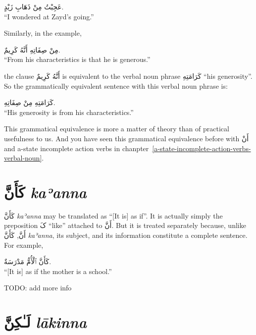 \documentclass[
  10pt,
]{book}
\begin{document}
\foreignlanguage{arabic}{عَجِبْتُ مِنْ ذَهَابِ زَيْدٍ.}\\
\enquote{I wondered at Zayd's going.}

Similarly, in the example,

\foreignlanguage{arabic}{مِنْ صِفَاتِهِ أَنَّهُ کَرِيمٌ.}\\
\enquote{From his characteristics is that he is generous.}

the clause
\foreignlanguage{arabic}{أَنَّهُ کَرِيمٌ}
is equivalent to the verbal noun phrase \foreignlanguage{arabic}{کَرَامَتِهِ} \enquote{his generosity}. So the grammatically equivalent sentence with this verbal noun phrase is:

\foreignlanguage{arabic}{کَرَامَتِهِ مِنْ صِفَاتِهِ.}\\
\enquote{His generosity is from his characteristics.}

This grammatical equivalence is more a matter of theory than of practical usefulness to us.
And you have seen this grammatical equivalence before with \foreignlanguage{arabic}{أَنْ} and a-state incomplete action verbs in chanpter~\ref{a-state-incomplete-action-verbs-verbal-noun}.

\section{\texorpdfstring{\foreignlanguage{arabic}{کَأَنَّ} \emph{kaʾanna}}{کَأَنَّ kaʾanna}}\label{ux643ux623ux646-kaeanna}

\foreignlanguage{arabic}{کَأَنَّ} \emph{kaʾanna}
may be translated as \enquote{{[}It is{]} as if}.
It is actually simply the preposition \foreignlanguage{arabic}{کَ} \enquote{like} attached to \foreignlanguage{arabic}{أَنَّ}. But it is treated separately because, unlike \foreignlanguage{arabic}{أَنَّ},
\foreignlanguage{arabic}{کَأَنَّ} \emph{kaʾanna}, its subject, and its information constitute a complete sentence. For example,

\foreignlanguage{arabic}{کَأَنَّ ٱلْأُمُّ مَدْرَسَةٌ.}\\
\enquote{{[}It is{]} as if the mother is a school.}

TODO: add more info

\section{\texorpdfstring{\foreignlanguage{arabic}{لَـٰکِنَّ} \emph{lākinna}}{لَـٰکِنَّ lākinna}}\label{ux644ux640ux643ux646-lakinna}
\end{document}
